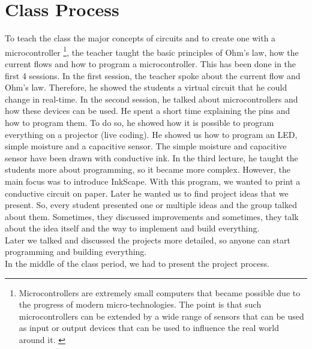 \documentclass[doc.tex]{subfiles}
\begin{document}
    \section{Class Process}
    \begin{flushleft}
        To teach the class the major concepts of circuits and to create one with a microcontroller {\footnote{\label{foot:
        microcontroller} Microcontrollers are extremely small computers that became possible due to the progress of modern 
        micro-technologies. The point is that such microcontrollers can be extended by a wide range of sensors that can 
        be used as input or output devices that can be used to influence the real world around it. \cite{Schief1997, 
        Dembowski2014}}}, the teacher taught the basic principles of Ohm's law, how the current flows and how to program 
        a microcontroller. This has been done in the first 4 sessions.\newline
        In the first session, the teacher spoke about the current flow and Ohm's law. Therefore, he showed the students
        a virtual circuit that he could change in real-time.\newline
        In the second session, he talked about microcontrollers and how these devices can be used. He spent a short
        time explaining the pins and how to program them. To do so, he showed how it is possible to program
        everything on a projector (live coding). He showed us how to program an LED, simple moisture and 
        a capacitive sensor. The simple moisture and capacitive sensor have been drawn with conductive ink.\newline
        In the third lecture, he taught the students more about programming, so it became more complex. However, 
        the main focus was to introduce InkScape. With this program, we wanted to print a conductive circuit on paper.\newline
        Later he wanted us to find project ideas that we present. So, every student presented one or multiple ideas and
        the group talked about them. Sometimes, they discussed improvements and sometimes, they talk about the idea itself
        and the way to implement and build everything. \\
        Later we talked and discussed the projects more detailed, so anyone can start programming and building everything.\\
        In the middle of the class period, we had to present the project process.  
    \end{flushleft}
\end{document}

